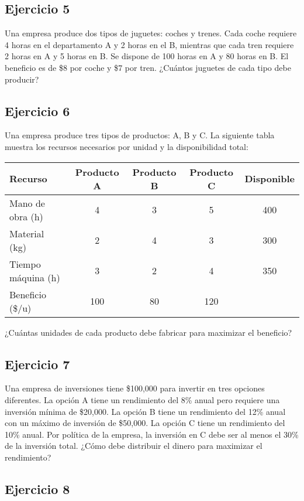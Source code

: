 \documentclass[12pt]{article}
\begin{document}
\subsection{Ejercicio 5}

Una empresa produce dos tipos de juguetes: coches y trenes. Cada coche requiere 4 horas en el departamento A y 2 horas en el B, mientras que cada tren requiere 2 horas en A y 5 horas en B. Se dispone de 100 horas en A y 80 horas en B. El beneficio es de \$8 por coche y \$7 por tren. ¿Cuántos juguetes de cada tipo debe producir?

\subsection{Ejercicio 6}

Una empresa produce tres tipos de productos: A, B y C. La siguiente tabla muestra los recursos necesarios por unidad y la disponibilidad total:

\begin{center}
\begin{tabular}{lcccc}
\toprule
Recurso & Producto A & Producto B & Producto C & Disponible \\
\midrule
Mano de obra (h) & 4 & 3 & 5 & 400 \\
Material (kg) & 2 & 4 & 3 & 300 \\
Tiempo máquina (h) & 3 & 2 & 4 & 350 \\
\midrule
Beneficio (\$/u) & 100 & 80 & 120 & \\
\bottomrule
\end{tabular}
\end{center}

¿Cuántas unidades de cada producto debe fabricar para maximizar el beneficio?

\subsection{Ejercicio 7}

Una empresa de inversiones tiene \$100,000 para invertir en tres opciones diferentes. La opción A tiene un rendimiento del 8\% anual pero requiere una inversión mínima de \$20,000. La opción B tiene un rendimiento del 12\% anual con un máximo de inversión de \$50,000. La opción C tiene un rendimiento del 10\% anual. Por política de la empresa, la inversión en C debe ser al menos el 30\% de la inversión total. ¿Cómo debe distribuir el dinero para maximizar el rendimiento?

\subsection{Ejercicio 8}
\end{document}
